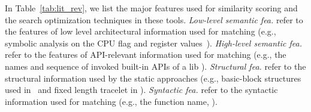 



In Table~\ref{tab:lit_rev}, we list the major features used for similarity scoring and the search optimization techniques in these tools. \emph{Low-level semantic fea.} refer to the features of low level architectural information used for matching (e.g., symbolic analysis on the CPU flag and register values~\cite{bingo}). \emph{High-level semantic fea.} refer to the features of API-relevant information used for matching (e.g., the names and sequence of invoked built-in APIs of a lib \cite{egele2014blanket}).
 \emph{Structural fea.} refer to the structural information used by the static approaches (e.g., basic-block structures used in~\cite{luo2014semantics,DBLP:conf/sp/PewnyGGRH15,sebastian2016discovre} and fixed length tracelet in \cite{DBLP:conf/pldi/DavidY14}).  \emph{Syntactic fea.}  refer to the syntactic information used for matching (e.g., the function name, ).


